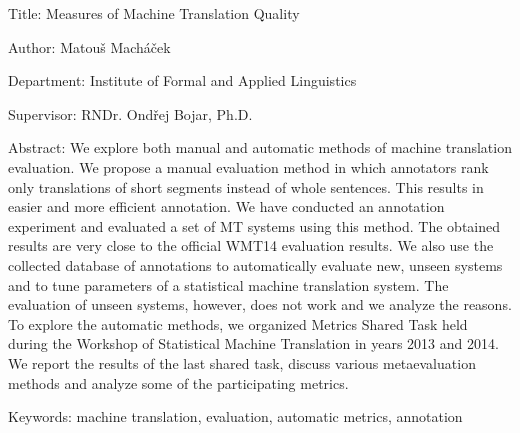 Title:
Measures of Machine Translation Quality

Author:
Matouš Macháček

Department:
Institute of Formal and Applied Linguistics

Supervisor:
RNDr. Ondřej Bojar, Ph.D.

Abstract: We explore both manual and automatic methods of machine translation
evaluation. We propose a manual evaluation method in which annotators rank only
translations of short segments instead of whole sentences. This results in
easier and more efficient annotation. We have conducted an annotation
experiment and evaluated a set of MT systems using this method. The obtained
results are very close to the official WMT14 evaluation results. We also use
the collected database of annotations to automatically evaluate new, unseen
systems and to tune parameters of a statistical machine translation system.
The evaluation of unseen systems, however, does not work and we analyze the
reasons. To explore the automatic methods, we organized Metrics Shared Task
held during the Workshop of Statistical Machine Translation in years 2013 and
2014. We report the results of the last shared task, discuss various
metaevaluation methods and analyze some of the participating metrics.


Keywords:
machine translation, evaluation, automatic metrics, annotation

